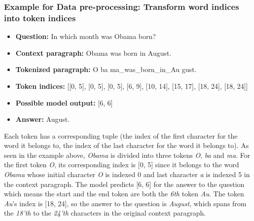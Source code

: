 \documentclass{article}
\begin{document}
\subsubsection{Example for Data pre-processing:  Transform word indices into token indices} \label{appendix_1}
\begin{itemize}
    \item \textbf{Question: } In which month was Obama born?
    \item \textbf{Context paragraph: } Obama was born in August.
    \item \textbf{Tokenized paragraph: } O ba ma\_was\_born\_in\_Au gust.
    \item \textbf{Token indices: } [[0, 5], [0, 5], [0, 5], [6, 9], [10, 14], [15, 17], [18, 24], [18, 24]]
    \item \textbf{Possible model output: } [6, 6]
    \item \textbf{Answer: } August.
\end{itemize}
Each token has a corresponding tuple (the index of the first character for the word it belongs to, the index of the last character for the word it belongs to). As seen in the example above, \textit{Obama} is divided into three tokens \textit{O}, \textit{ba} and \textit{ma}. For the first token \textit{O}, its corresponding index is [0, 5] since it belongs to the word \textit{Obama} whose initial character \textit{O} is indexed 0 and last character \textit{a} is indexed 5 in the context paragraph. The model predicts [6, 6] for the answer to the question which means the start and the end token are both the \textit{6th} token \textit{Au}. The token \textit{Au}'s index is [18, 24], so the answer to the question is \textit{August}, which spans from the \textit{18'th} to the \textit{24'th} characters in the original context paragraph.
\end{document}
